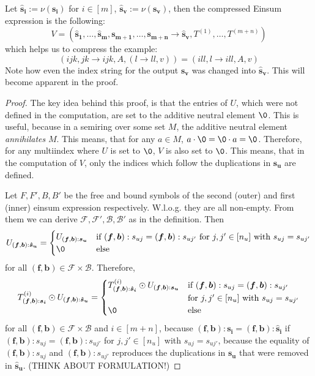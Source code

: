 \begin{theorem}
    Let $\bm{\hat{s}_i} := \nu(\bm{s_i})$ for $i \in [m]$, $\bm{\hat{s}_v} := \nu(\bm{s_v})$, then the compressed Einsum expression is the following:
    $$V = (\bm{\hat{s}_1},\dots,\bm{\hat{s}_m}, \bm{s_{m + 1}}, \dots, \bm{s_{m + n}} \rightarrow \bm{\hat{s}_v}, T^{(1)},\dots,T^{(m + n)})$$
    which helps us to compress the example:
    $$(ijk, jk \rightarrow ijk, A, (l \rightarrow ll, v)) = (ill, l \rightarrow ill, A, v)$$
    Note how even the index string for the output $\bm{s_v}$ was changed into $\bm{\hat{s}_v}$.
    This will become apparent in the proof.
\end{theorem}

\begin{proof}
    \small
    The key idea behind this proof, is that the entries of $U$, which were not defined in the computation, are set to the additive neutral element $\0$.
    This is useful, because in a semiring over some set $M$, the additive neutral element \textit{annihilates} $M$.
    This means, that for any $a \in M$, $a \cdot \0 = \0 \cdot a = \0$.
    Therefore, for any multiindex where $U$ is set to $\0$, $V$ is also set to $\0$.
    This means, that in the computation of $V$, only the indices which follow the duplications in $\bm{s_u}$ are defined.

    Let $F, F', B, B'$ be the free and bound symbols of the second (outer) and first (inner) einsum expression respectively.
    W.l.o.g. they are all non-empty.
    From them we can derive $\mathcal{F}, \mathcal{F}', \mathcal{B}, \mathcal{B}'$ as in the definition.
    Then
    $$U_{(\bm{f}, \bm{b}): \bm{\hat{s}_u}} = \begin{cases}
            U_{(\bm{f}, \bm{b}): \bm{s_u}} & \text{if } (\bm{f}, \bm{b}):s_{uj} = (\bm{f}, \bm{b}):s_{uj'} \text{ for } j,j' \in [n_u] \text{ with } s_{uj} = s_{uj'} \\
            \0                             & \text{else}
        \end{cases}$$
    for all $(\bm{f}, \bm{b}) \in \mathcal{F} \times \mathcal{B}$.
    Therefore,
    $$T^{(i)}_{(\bm{f}, \bm{b}): \bm{s_i}} \odot U_{(\bm{f}, \bm{b}): \bm{\hat{s}_u}} = \begin{cases}
            T^{(i)}_{(\bm{f}, \bm{b}): \bm{\hat{s}_i}} \odot U_{(\bm{f}, \bm{b}): \bm{s_u}} & \text{if } (\bm{f}, \bm{b}):s_{uj} = (\bm{f}, \bm{b}):s_{uj'} \\
                                                                                            & \text{for } j,j' \in [n_u] \text{ with } s_{uj} = s_{uj'}     \\
            \0                                                                              & \text{else}
        \end{cases}$$
    for all $(\bm{f}, \bm{b}) \in \mathcal{F} \times \mathcal{B}$ and $i \in [m + n]$,
    because $(\bm{f}, \bm{b}): \bm{s_i} = (\bm{f}, \bm{b}): \bm{\hat{s}_i}$ if $(\bm{f}, \bm{b}):s_{uj} = (\bm{f}, \bm{b}):s_{uj'}$ for $j,j' \in [n_u]$ with $s_{uj} = s_{uj'}$,
    because the equality of $(\bm{f}, \bm{b}):s_{uj}$ and $(\bm{f}, \bm{b}):s_{uj'}$ reproduces the duplications in $\bm{s_u}$ that were removed in $\bm{\hat{s}_u}$.
    (THINK ABOUT FORMULATION!)


\end{proof}
